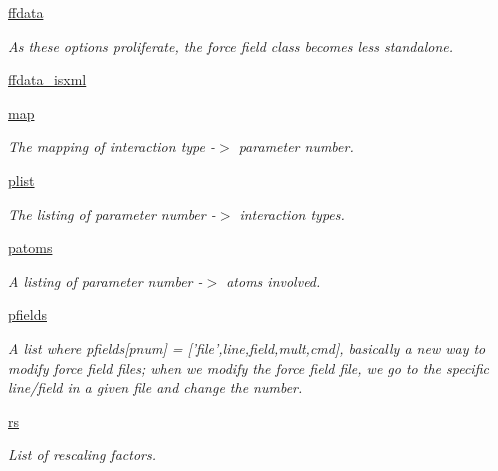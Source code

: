 \begin{DoxyCompactItemize}
\item 
\hyperlink{classforcebalance_1_1forcefield_1_1FF_aa33e01455044a76e265e6eafbf9c90d6}{ffdata}
\begin{DoxyCompactList}\small\item\em As these options proliferate, the force field class becomes less standalone. \end{DoxyCompactList}\item 
\hyperlink{classforcebalance_1_1forcefield_1_1FF_af942210095e12b4995a64ca461cd5d76}{ffdata\-\_\-isxml}
\item 
\hyperlink{classforcebalance_1_1forcefield_1_1FF_adac6add3391d052c319902ccc8e0a617}{map}
\begin{DoxyCompactList}\small\item\em The mapping of interaction type -\/$>$ parameter number. \end{DoxyCompactList}\item 
\hyperlink{classforcebalance_1_1forcefield_1_1FF_a72d2a63abbeae0b783a1e3e4077b3ab1}{plist}
\begin{DoxyCompactList}\small\item\em The listing of parameter number -\/$>$ interaction types. \end{DoxyCompactList}\item 
\hyperlink{classforcebalance_1_1forcefield_1_1FF_a3b22e1846666d6f704e0620413a95d14}{patoms}
\begin{DoxyCompactList}\small\item\em A listing of parameter number -\/$>$ atoms involved. \end{DoxyCompactList}\item 
\hyperlink{classforcebalance_1_1forcefield_1_1FF_a8f5c9c11cd2f164a2ff6e310c1bc79f1}{pfields}
\begin{DoxyCompactList}\small\item\em A list where pfields\mbox{[}pnum\mbox{]} = \mbox{[}'file',line,field,mult,cmd\mbox{]}, basically a new way to modify force field files; when we modify the force field file, we go to the specific line/field in a given file and change the number. \end{DoxyCompactList}\item 
\hyperlink{classforcebalance_1_1forcefield_1_1FF_acf33c8285b56b92510b5572448c3358e}{rs}
\begin{DoxyCompactList}\small\item\em List of rescaling factors. \end{DoxyCompactList}\item 

\end{DoxyCompactItemize}
